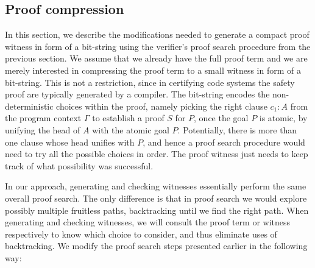 \documentclass{llncs}
\begin{document}
\subsection{Proof compression}
In this section, we describe the modifications needed to generate
a compact proof witness in form of a bit-string using the verifier's
proof search procedure from the previous section. 
We assume that we already have the full proof term and we are merely
interested in compressing the proof term to a small witness in form of
a bit-string. This is not a restriction, since in certifying code
systems the safety proof are typically generated by a compiler. 
The bit-string encodes the non-deterministic choices within the proof,
namely picking the right clause $c_1{:}A$ from the program context
$\Gamma$ to establish a proof $S$ for $P$, once the goal $P$ is
atomic, by unifying the head of $A$ with the atomic goal
$P$. Potentially, there is more than one clause whose head unifies
with $P$, and hence a proof search procedure would need to try all the
possible choices in order. The proof witness just needs to keep track
of what possibility was successful.


In our approach, generating and checking witnesses essentially perform
the same overall proof search. The only difference is that in proof
search we would explore possibly multiple fruitless paths,
backtracking until we find the right path. When generating and
checking witnesses, we will consult the proof term or witness
respectively to know which choice to consider, and thus eliminate uses
of backtracking.  We modify the proof search steps presented earlier
in the following way:
\end{document}
